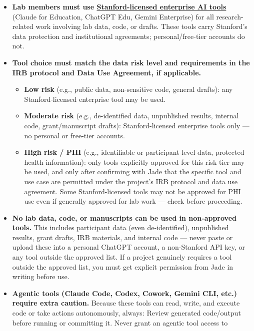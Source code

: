 \documentclass[
]{book}
\providecommand{\tightlist}{%
  \setlength{\itemsep}{0pt}\setlength{\parskip}{0pt}}
\begin{document}
\begin{itemize}
\item
  \textbf{Lab members must use \href{https://uit.stanford.edu/ai/connectors}{Stanford-licensed enterprise AI
  tools}} (Claude for
  Education, ChatGPT Edu, Gemini Enterprise) for all research-related
  work involving lab data, code, or drafts. These tools carry Stanford's
  data protection and institutional agreements; personal/free-tier
  accounts do not.
\item
  \textbf{Tool choice must match the data risk level and requirements in the
  IRB protocol and Data Use Agreement, if applicable.}

  \begin{itemize}
  \tightlist
  \item
    \textbf{Low risk} (e.g., public data, non-sensitive code, general
    drafts): any Stanford-licensed enterprise tool may be used.
  \item
    \textbf{Moderate risk} (e.g., de-identified data, unpublished results,
    internal code, grant/manuscript drafts): Stanford-licensed
    enterprise tools only --- no personal or free-tier accounts.
  \item
    \textbf{High risk / PHI} (e.g., identifiable or participant-level data,
    protected health information): only tools explicitly approved for
    this risk tier may be used, and only after confirming with Jade that
    the specific tool and use case are permitted under the project's IRB
    protocol and data use agreement. Some Stanford-licensed tools may
    not be approved for PHI use even if generally approved for lab work
    --- check before proceeding.
  \end{itemize}
\item
  \textbf{No lab data, code, or manuscripts can be used in non-approved
  tools.} This includes participant data (even de-identified),
  unpublished results, grant drafts, IRB materials, and internal code ---
  never paste or upload these into a personal ChatGPT account, a
  non-Stanford API key, or any tool outside the approved list. If a project
  genuinely requires a tool outside the approved list, you must get explicit permission from Jade in writing before use.
\item
  \textbf{Agentic tools (Claude Code, Codex, Cowork, Gemini CLI, etc.) require
  extra caution.} Because these tools can read, write, and execute code
  or take actions autonomously, always: Review generated code/output
  before running or committing it. Never grant an agentic tool access to

\end{itemize}
\end{document}

